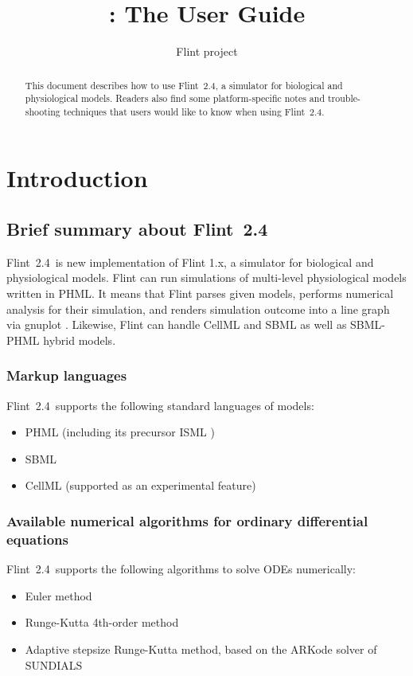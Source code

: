 \documentclass[a4paper,10pt]{report}
\title{\Flint: The User Guide}
\author{Flint project}
\def\FlintVersion{2.4}
\def\Flint{Flint~\FlintVersion}
\def\Tagline{a simulator for biological and physiological models}
\begin{document}
\maketitle

\begin{abstract}
This document describes how to use \Flint, \Tagline.
Readers also find some platform-specific notes and trouble-shooting techniques that
users would like to know when using \Flint.
\end{abstract}

\tableofcontents

\vfill

\doclicenseThis


\chapter{Introduction}

\section{Brief summary about \Flint}
\Flint~is new implementation of Flint 1.x, \Tagline.
Flint can run simulations of multi-level physiological models written in PHML.
It means that Flint parses given models, performs numerical analysis for their
simulation, and renders simulation outcome into a line graph via gnuplot \cite{gnuplot}.
Likewise, Flint can handle CellML and SBML as well as SBML-PHML hybrid models.

\subsection{Markup languages}
\Flint\ supports the following standard languages of models:
\begin{itemize}
\item PHML \cite{PHML} (including its precursor ISML \cite{ISML})
\item SBML \cite{SBML}
\item CellML \cite{CellML} (supported as an experimental feature)
\end{itemize}

\subsection{Available numerical algorithms for ordinary differential equations}
\Flint\ supports the following algorithms to solve ODEs numerically:
\begin{itemize}
\item Euler method
\item Runge-Kutta 4th-order method
\item Adaptive stepsize Runge-Kutta method, based on the ARKode solver of
  SUNDIALS \cite{hindmarsh2005sundials}
\end{itemize}
\end{document}

